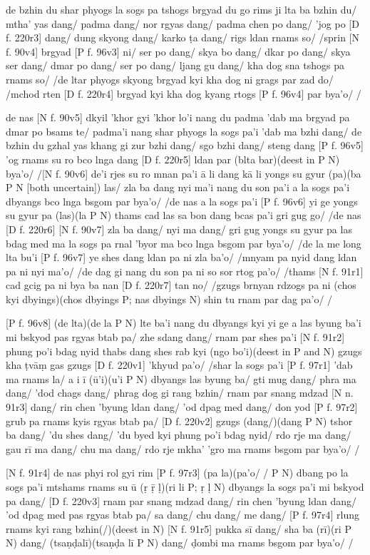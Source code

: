 \documentclass[naipra.tex]{subfiles}
\begin{document}
de bzhin du shar phyogs la sogs pa tshogs brgyad du go rims ji lta ba bzhin du/ mtha' yas dang/ padma dang/ nor rgyas dang/ padma chen po dang/ 'jog po [D f. 220r3] dang/ dung skyong dang/ karko ṭa dang/ rigs ldan rnams so/ /sprin [N f. 90v4] brgyad [P f. 96v3] ni/ ser po dang/ skya bo dang/ dkar po dang/ skya ser dang/ dmar po dang/ ser po dang/ ljang gu dang/ kha dog sna tshogs pa rnams so/ /de ltar phyogs skyong brgyad kyi kha dog ni grags par zad do/ /mchod rten [D f. 220r4] brgyad kyi kha dog kyang rtogs [P f. 96v4] par bya'o/ /

de nas [N f. 90v5] dkyil 'khor gyi 'khor lo'i nang du padma 'dab ma brgyad pa dmar po bsams te/ padma'i nang shar phyogs la sogs pa'i 'dab ma bzhi dang/ de bzhin du gzhal yas khang gi zur bzhi dang/ sgo bzhi dang/ steng dang [P f. 96v5] 'og rnams su ro bco lnga dang [D f. 220r5] ldan par (blta bar)(deest in P N) bya'o/ /[N f. 90v6] de'i rjes su ro mnan pa'i ā li dang kā li yongs su gyur (pa)(ba P N [both uncertain]) las/ zla ba dang nyi ma'i nang du son pa'i a la sogs pa'i dbyangs bco lnga bsgom par bya'o/ /de nas a la sogs pa'i [P f. 96v6] yi ge yongs su gyur pa (las)(la P N) thams cad las sa bon dang bcas pa'i gri gug go/ /de nas [D f. 220r6] [N f. 90v7] zla ba dang/ nyi ma dang/ gri gug yongs su gyur pa las bdag med ma la sogs pa rnal 'byor ma bco lnga bsgom par bya'o/ /de la me long lta bu'i [P f. 96v7] ye shes dang ldan pa ni zla ba'o/ /mnyam pa nyid dang ldan pa ni nyi ma'o/ /de dag gi nang du son pa ni so sor rtog pa'o/ /thams [N f. 91r1] cad gcig pa ni bya ba nan [D f. 220r7] tan no/ /gzugs brnyan rdzogs pa ni (chos kyi dbyings)(chos dbyings P; nas dbyings N) shin tu rnam par dag pa'o/ /

[P f. 96v8] (de lta)(de la P N) lte ba'i nang du dbyangs kyi yi ge a las byung ba'i mi bskyod pas rgyas btab pa/ zhe sdang dang/ rnam par shes pa'i [N f. 91r2] phung po'i bdag nyid thabs dang shes rab kyi (ngo bo'i)(deest in P and N) gzugs kha ṭvāṃ gas gzugs [D f. 220v1] 'khyud pa'o/ /shar la sogs pa'i [P f. 97r1] 'dab ma rnams la/ a i ī (ū'i)(u'i P N) dbyangs las byung ba/ gti mug dang/ phra ma dang/ 'dod chags dang/ phrag dog gi rang bzhin/ rnam par snang mdzad [N n. 91r3] dang/ rin chen 'byung ldan dang/ 'od dpag med dang/ don yod [P f. 97r2] grub pa rnams kyis rgyas btab pa/ [D f. 220v2] gzugs (dang/)(dang P N) tshor ba dang/ 'du shes dang/ 'du byed kyi phung po'i bdag nyid/ rdo rje ma dang/ gau rī ma dang/ chu ma dang/ rdo rje mkha' 'gro ma rnams bsgom par bya'o/ /

[N f. 91r4] de nas phyi rol gyi rim [P f. 97r3] (pa la)(pa'o/ / P N) dbang po la sogs pa'i mtshams rnams su ū (ṛ ṝ ḷ)(ri li P; ṛ ḷ N) dbyangs la sogs pa'i mi bskyod pa dang/ [D f. 220v3] rnam par snang mdzad dang/ rin chen 'byung ldan dang/ 'od dpag med pas rgyas btab pa/ sa dang/ chu dang/ me dang/ [P f. 97r4] rlung rnams kyi rang bzhin(/)(deest in N) [N f. 91r5] pukka sī dang/ sha ba (rī)(ri P N) dang/ (tsaṇḍalī)(tsaṇḍa lī P N) dang/ ḍombi ma rnams bsgom par bya'o/ /
\end{document}
